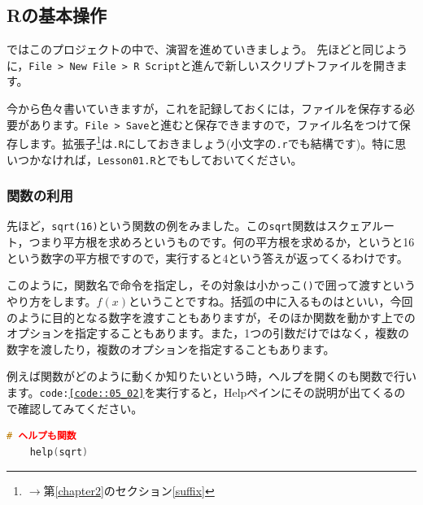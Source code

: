\documentclass{ltjbook}
\begin{document}
\subsection{Rの基本操作}
ではこのプロジェクトの中で、演習を進めていきましょう。
先ほどと同じように，\verb|File > New File > R Script|と進んで新しいスクリプトファイルを開きます。

今から色々書いていきますが，これを記録しておくには，ファイルを保存する必要があります。\verb|File > Save|と進むと保存できますので，ファイル名をつけて保存します。拡張子\footnote{$\to$第\ref{chapter2}のセクション\ref{suffix}}は\texttt{.R}にしておきましょう(小文字の\texttt{.r}でも結構です)。特に思いつかなければ，\texttt{Lesson01.R}とでもしておいてください。

\subsubsection{関数の利用}
先ほど，\texttt{sqrt(16)}という関数の例をみました。この\texttt{sqrt}関数はスクェアルート，つまり平方根を求めろというものです。何の平方根を求めるか，というと16という数字の平方根ですので，実行すると4という答えが返ってくるわけです。

このように，関数名で命令を指定し，その対象は小かっこ\verb|()|で囲って渡すというやり方をします。$f(x)$ということですね。括弧の中に入るものはといい，今回のように目的となる数字を渡すこともありますが，そのほか関数を動かす上でのオプションを指定することもあります。また，1つの引数だけではなく，複数の数字を渡したり，複数のオプションを指定することもあります。

例えば関数がどのように動くか知りたいという時，ヘルプを開くのも関数で行います。\texttt{code:\ref{code::05_02}}を実行すると，Helpペインにその説明が出てくるので確認してみてください。
\begin{lstlisting}[language=c++,label={code::05_02},caption={ヘルプのコード}]
	# ヘルプも関数
	help(sqrt)
\end{lstlisting}
\end{document}
